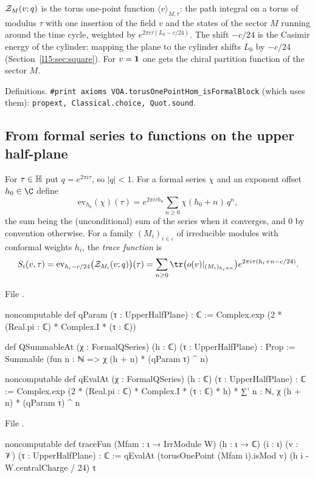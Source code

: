 \begin{physics}
$\mathcal{Z}_M(v;q)$ is the torus one-point function $\langle v\rangle_{M,\tau}$: the path integral on a torus of modulus
$\tau$ with one insertion of the field $v$ and the states of the sector $M$ running around the time cycle, weighted
by $e^{2\pi i\tau(L_0-c/24)}$. The shift $-c/24$ is the Casimir energy of the cylinder: mapping the plane to the cylinder
shifts $L_0$ by $-c/24$ (Section~\ref{l15:sec:square}). For $v=\mathbf{1}$ one gets the chiral partition function of
the sector $M$.
\end{physics}

\begin{status}
Definitions. \texttt{\#print axioms VOA.torusOnePointHom\_isFormalBlock} (which uses them): \texttt{propext,
Classical.choice, Quot.sound}.
\end{status}

\subsection{From formal series to functions on the upper half-plane}

\begin{definition}\label{l15:def:traceFun}
For $\tau\in\mathbb{H}$ put $q=e^{2\pi i\tau}$, so $|q|<1$. For a formal series $\chi$ and an exponent offset
$h_0\in\C$ define
\begin{equation*}
  \mathrm{ev}_{h_0}(\chi)(\tau)=e^{2\pi i\tau h_0}\sum_{n\ge0}\chi(h_0+n)\,q^n,
\end{equation*}
the sum being the (unconditional) sum of the series when it converges, and $0$ by convention otherwise. For a family
$(M_i)_{i\in\iota}$ of irreducible modules with conformal weights $h_i$, the \emph{trace function} is
\begin{equation*}
  S_i(v,\tau)=\mathrm{ev}_{h_i-c/24}\bigl(\lfifteenZ_{M_i}(v;q)\bigr)(\tau)=\sum_{n\ge0}\tr\bigl(o(v)|_{(M_i)_{h_i+n}}\bigr)e^{2\pi i\tau(h_i+n-c/24)}.
\end{equation*}
\end{definition}
\noindent File .
\begin{leancode}
noncomputable def qParam (τ : UpperHalfPlane) : ℂ :=
  Complex.exp (2 * (Real.pi : ℂ) * Complex.I * (τ : ℂ))

def QSummableAt (χ : FormalQSeries) (h : ℂ) (τ : UpperHalfPlane) : Prop :=
  Summable (fun n : ℕ => χ (h + n) * (qParam τ) ^ n)

noncomputable def qEvalAt (χ : FormalQSeries) (h : ℂ) (τ : UpperHalfPlane) : ℂ :=
  Complex.exp (2 * (Real.pi : ℂ) * Complex.I * (τ : ℂ) * h) *
    ∑' n : ℕ, χ (h + n) * (qParam τ) ^ n
\end{leancode}
\noindent File .
\begin{leancode}
noncomputable def traceFun (Mfam : ι → IrrModule W) (h : ι → ℂ) (i : ι) (v : 𝒱)
    (τ : UpperHalfPlane) : ℂ :=
  qEvalAt (torusOnePoint (Mfam i).isMod v) (h i - W.centralCharge / 24) τ
\end{leancode}


